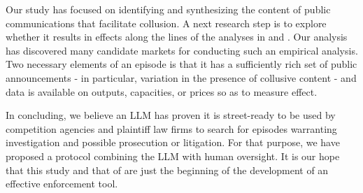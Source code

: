Our study has focused on identifying and synthesizing the content of public 
communications that facilitate collusion. A next research step is to explore 
whether it results in effects along the lines of the analyses in \textcite{aryal2022coordinated} 
and \textcite{sheng2024public}. Our analysis has discovered many candidate 
markets for conducting such an empirical analysis. Two necessary elements of 
an episode is that it has a sufficiently rich set of public announcements - in 
particular, variation in the presence of collusive content - and data is 
available on outputs, capacities, or prices so as to measure effect. 

In concluding, we believe an LLM has proven it is street-ready to be 
used by competition agencies and plaintiff law firms to search for episodes 
warranting investigation and possible prosecution or litigation. For that 
purpose, we have proposed a protocol combining the LLM with human oversight. 
It is our hope that this study and that of \textcite{duso2025public} are just the 
beginning of the development of an effective enforcement tool.
